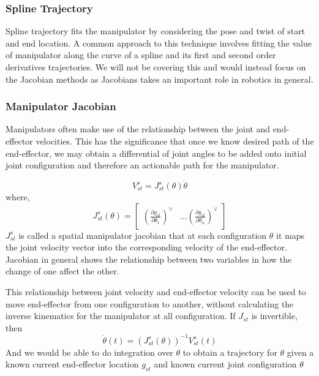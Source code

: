 \documentclass[letterpaper]{article}
\begin{document}
\subsubsection{Spline Trajectory}
Spline trajectory fits the manipulator by considering the pose and twist of start
and end location. A common approach to this technique involves fitting the value of manipulator
along the curve of a spline and its first and second order derivatives trajectories. We will not be covering
this and would instead focus on the Jacobian methods as Jacobians takes an important role in robotics in
general. 

\subsubsection{Manipulator Jacobian}
Manipulators often make use of the relationship between the joint and end-effector
velocities. This has the significance that once we know desired path of the 
end-effector, we may obtain a differential of joint angles to be added onto
initial joint configuration and therefore an actionable path for the manipulator.

\begin{equation*}
  V^{s}_{st} = J^{s}_{st}(\theta)\dot{\theta}
\end{equation*}
where,
\begin{equation*}
  J^s_{st}(\theta) = \begin{bmatrix}
    \left(\frac{\partial g_{st}}{\partial \theta_1}\right)^\vee & \dots
    \left(\frac{\partial g_{st}}{\partial \theta_n}\right)^\vee
  \end{bmatrix}
\end{equation*}
$J^s_{st}$ is called a spatial manipulator jacobian that at each configuration $\theta$
it maps the joint velocity vector into the corresponding velocity of the
end-effector. Jacobian in general shows the relationship between two variables in how
the change of one affect the other.

This relationship between joint velocity and end-effector velocity can be used
to move end-effector from one configuration to another, without calculating the
inverse kinematics for the manipulator at all configuration. If $J_{st}$ is invertible,
then
\begin{equation*}
  \dot{\theta}(t) = \left(J^{s}_{st}(\theta)\right)^{-1}V^{s}_{st}(t)
\end{equation*}
And we would be able to do integration over $\theta$ to obtain a trajectory for 
$\theta$ given a known current end-effector location $g_{st}$ and known
current joint configuration $\theta$
\end{document}

